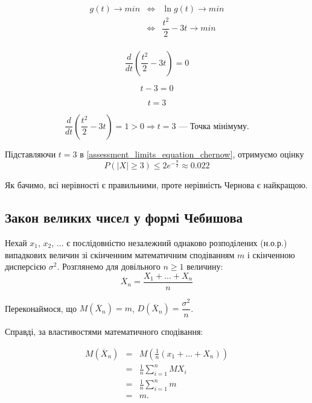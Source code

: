 \begin{example}
\begin{itemize}
            $$\begin{array}{rcl}
                g(t) \rightarrow min & \Leftrightarrow & \ln g(t) \rightarrow min \\
                & \Leftrightarrow &  \dfrac{t^2}{2} - 3t  \rightarrow min \\
            \end{array}$$
            
            $$\dfrac{d}{dt} (\dfrac{t^2}{2} - 3t) = 0$$

            $$t-3 = 0$$

            $$t = 3$$

            $$\dfrac{d}{dt} (\dfrac{t^2}{2} - 3t) = 1 > 0 \Rightarrow t = 3 \text{ --- Точка мінімуму.}$$
            
            Підставляючи $t = 3$ в \ref{assessment_limits_equation_chernow},
            отримуємо оцінку
            $$P(|X| \geqslant 3) \leqslant 2 e^{-\frac{9}{2}} \approx 0.022$$
    \end{itemize}
\end{example}

Як бачимо, всі нерівності є правильними, проте нерівність Чернова є найкращою.


\subsection{Закон великих чисел у формі Чебишова}

Нехай $x_1$, $x_2$, ... є послідовністю незалежний однаково розподілених (н.о.р.)
випадкових величин зі скінченним математичним сподіванням $m$ і 
скінченною дисперсією $\sigma^2$.
Розглянемо для довільного $n \geqslant 1$ величину:
\begin{equation}
    \label{law_of_large_numbers}
    \overline{X}_n = \dfrac{X_1 + ... + X_n}{n}
\end{equation}

Переконаймося, що $M(\overline{X}_n) = m$,
$D(\overline{X}_n) = \dfrac{\sigma^2}{n}$.

Справді, за властивостями математичного сподівання:

$$\begin{array}{rcl}
    M(\overline{X}_n) & = & M(\frac{1}{n}(x_1 + ... + X_n)) \\
    & = & \frac{1}{n} \sum\limits_{i=1}^{n} M X_i \\
    & = & \frac{1}{n} \sum\limits_{i=1}^{n} m \\
    & = & m. \\
\end{array}$$


